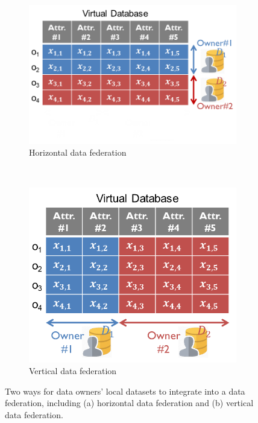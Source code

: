 \documentclass[11pt]{article}
\begin{document}
\begin{figure}[t]
	\centering
	\begin{subfigure}[b]{0.52\textwidth}
		\includegraphics[width=\textwidth]{fig/horizontal-partition.png}
		\caption{Horizontal data federation}\label{fig:horizontal-data-partition}
	\end{subfigure}
	~
	\begin{subfigure}[b]{0.42\textwidth}
		\includegraphics[width=\textwidth]{fig/vertical-partition.png}
		\caption{Vertical data federation}\label{fig:vertical-data-partition}
	\end{subfigure}
	\caption{Two ways for data owners' local datasets to integrate into a data federation, including (a) horizontal data federation and (b) vertical data federation.}\label{fig:data-partition}
\end{figure}
\end{document}
